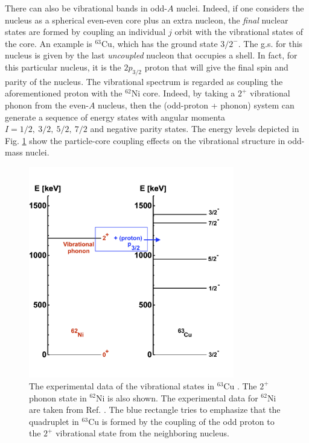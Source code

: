 There can also be vibrational bands in odd-$A$ nuclei. Indeed, if one considers the nucleus as a spherical even-even core plus an extra nucleon, the \emph{final} nuclear states are formed by coupling an individual $j$ orbit with the vibrational states of the core. An example is $^{63}$Cu, which has the ground state $3/2^{-}$. The g.s. for this nucleus is given by the last \emph{uncoupled} nucleon that occupies a shell. In fact, for this particular nucleus, it is the $2p_{3/2}$ proton that will give the final spin and parity of the nucleus. The vibrational spectrum is regarded as coupling the aforementioned proton with the $^{62}$Ni core. Indeed, by taking a $2^+$ vibrational phonon from the even-$A$ nucleus, then the (odd-proton + phonon) system can generate a sequence of energy states with angular momenta $I=1/2,\ 3/2,\ 5/2,\ 7/2$ and negative parity states. The energy levels depicted in Fig. \ref{energy-levels-63Cu-virbational-band} show the particle-core coupling effects on the vibrational structure in odd-mass nuclei.
\begin{figure}
    \centering
    \includegraphics[width=0.8\textwidth]{Chapters/Figures/63Cu_vib_experimental.png}
    \caption{The experimental data of the vibrational states in $^{63}$Cu \cite{erjun2001nuclear}. The $2^+$ phonon state in $^{62}$Ni is also shown. The experimental data for $^{62}$Ni are taken from Ref. \cite{nichols2012nuclear}. The blue rectangle tries to emphasize that the quadruplet in $^{63}$Cu is formed by the coupling of the odd proton to the $2^+$ vibrational state from the neighboring nucleus.}
    \label{energy-levels-63Cu-virbational-band}
\end{figure}

